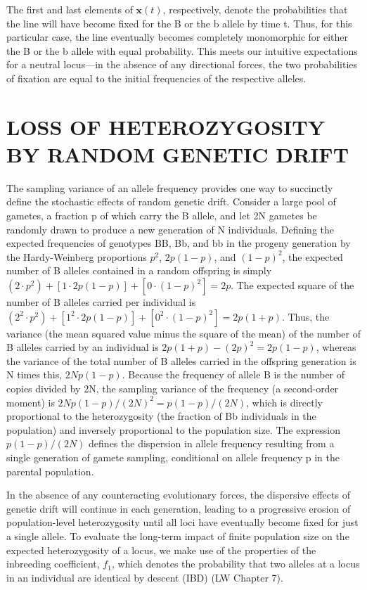 \documentclass{article}
\begin{document}
The first and last elements of  $ \mathbf{x}(t) $, respectively, denote the probabilities that the line will have become fixed for the B or the b allele by time t. Thus, for this particular case, the line eventually becomes completely monomorphic for either the B or the b allele with equal probability. This meets our intuitive expectations for a neutral locus—in the absence of any directional forces, the two probabilities of fixation are equal to the initial frequencies of the respective alleles.

\section{LOSS OF HETEROZYGOSITY BY RANDOM GENETIC DRIFT}
The sampling variance of an allele frequency provides one way to succinctly define the stochastic effects of random genetic drift. Consider a large pool of gametes, a fraction p of which carry the B allele, and let 2N gametes be randomly drawn to produce a new generation of N individuals. Defining the expected frequencies of genotypes BB, Bb, and bb in the progeny generation by the Hardy-Weinberg proportions  $ p^2 $,  $ 2p(1-p) $, and  $ (1-p)^2 $, the expected number of B alleles contained in a random offspring is simply  $ (2 \cdot p^2) + [1 \cdot 2p(1-p)] + [0 \cdot (1-p)^2] = 2p $. The expected square of the number of B alleles carried per individual is  $ (2^2 \cdot p^2) + [1^2 \cdot 2p(1-p)] + [0^2 \cdot (1-p)^2] = 2p(1+p) $. Thus, the variance (the mean squared value minus the square of the mean) of the number of B alleles carried by an individual is  $ 2p(1+p) - (2p)^2 = 2p(1-p) $, whereas the variance of the total number of B alleles carried in the offspring generation is N times this,  $ 2Np(1-p) $. Because the frequency of allele B is the number of copies divided by 2N, the sampling variance of the frequency (a second-order moment) is  $ 2Np(1-p)/(2N)^2 = p(1-p)/(2N) $, which is directly proportional to the heterozygosity (the fraction of Bb individuals in the population) and inversely proportional to the population size. The expression  $ p(1-p)/(2N) $ defines the dispersion in allele frequency resulting from a single generation of gamete sampling, conditional on allele frequency p in the parental population.

In the absence of any counteracting evolutionary forces, the dispersive effects of genetic drift will continue in each generation, leading to a progressive erosion of population-level heterozygosity until all loci have eventually become fixed for just a single allele. To evaluate the long-term impact of finite population size on the expected heterozygosity of a locus, we make use of the properties of the inbreeding coefficient,  $ f_{1} $, which denotes the probability that two alleles at a locus in an individual are identical by descent (IBD) (LW Chapter 7).
\end{document}
